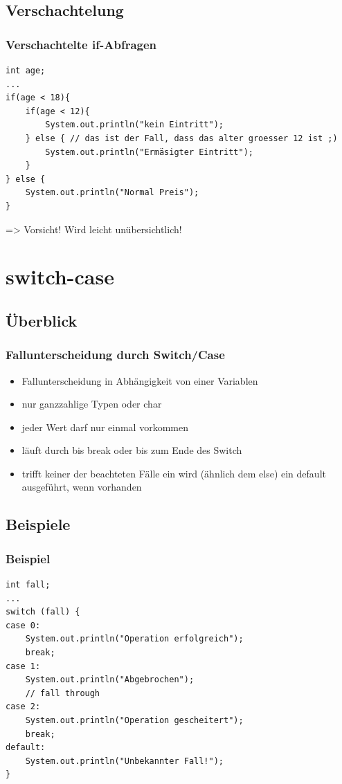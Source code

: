 \documentclass[final]{beamer}
\begin{document}
\subsection{Verschachtelung}
\begin{frame}[containsverbatim]
	\frametitle{Verschachtelte if-Abfragen}
	\begin{lstlisting}
int age;
...
if(age < 18){
	if(age < 12){
		System.out.println("kein Eintritt");
	} else { // das ist der Fall, dass das alter groesser 12 ist ;)
		System.out.println("Ermäsigter Eintritt");
	}
} else {
	System.out.println("Normal Preis");
}
	\end{lstlisting}
	=> Vorsicht! Wird leicht unübersichtlich!
\end{frame}

\section{switch-case}
\subsection{Überblick}
\begin{frame}[containsverbatim]
	\frametitle{Fallunterscheidung durch Switch/Case}
	\begin{itemize}
		\item{Fallunterscheidung in Abhängigkeit von einer Variablen}
		\item{nur ganzzahlige Typen oder char}
		\item{jeder Wert darf nur einmal vorkommen}
		\item{läuft durch bis break oder bis zum Ende des Switch}
		\item{trifft keiner der beachteten Fälle ein wird (ähnlich dem else) ein default ausgeführt, wenn vorhanden}
	\end{itemize}
\end{frame}


\subsection{Beispiele}
\begin{frame}[containsverbatim]
	\frametitle{Beispiel}
	\begin{lstlisting}
int fall;
...
switch (fall) {
case 0:
	System.out.println("Operation erfolgreich");
	break;
case 1:
	System.out.println("Abgebrochen");
	// fall through
case 2:
	System.out.println("Operation gescheitert");
	break;
default:
	System.out.println("Unbekannter Fall!");
}
	\end{lstlisting}
\end{frame}
\end{document}
